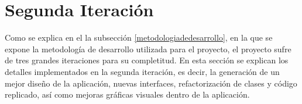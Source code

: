 \chapter{Segunda Iteración}

Como se explica en el la subsección \ref{metodologiadedesarrollo}, en la que se expone la metodología de desarrollo utilizada para el proyecto, el proyecto sufre de tres grandes iteraciones para su completitud. En esta sección se explican los detalles implementados en la segunda iteración, es decir, la generación de un mejor diseño de la aplicación, nuevas interfaces, refactorización de clases y código replicado, así como mejoras gráficas visuales dentro de la aplicación.

